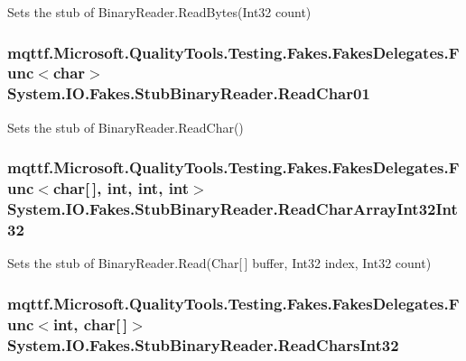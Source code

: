 Sets the stub of Binary\-Reader.\-Read\-Bytes(\-Int32 count)

\hypertarget{class_system_1_1_i_o_1_1_fakes_1_1_stub_binary_reader_a1932ca0fee22013df724e74ee7203d75}{
\subsubsection[{Read\-Char01}]{\setlength{\rightskip}{0pt plus 5cm}mqttf.\-Microsoft.\-Quality\-Tools.\-Testing.\-Fakes.\-Fakes\-Delegates.\-Func$<$char$>$ System.\-I\-O.\-Fakes.\-Stub\-Binary\-Reader.\-Read\-Char01}}\label{class_system_1_1_i_o_1_1_fakes_1_1_stub_binary_reader_a1932ca0fee22013df724e74ee7203d75}


Sets the stub of Binary\-Reader.\-Read\-Char()

\hypertarget{class_system_1_1_i_o_1_1_fakes_1_1_stub_binary_reader_a8f63f2824a6d562de233a67c249feaeb}{
\subsubsection[{Read\-Char\-Array\-Int32\-Int32}]{\setlength{\rightskip}{0pt plus 5cm}mqttf.\-Microsoft.\-Quality\-Tools.\-Testing.\-Fakes.\-Fakes\-Delegates.\-Func$<$char\mbox{[}$\,$\mbox{]}, int, int, int$>$ System.\-I\-O.\-Fakes.\-Stub\-Binary\-Reader.\-Read\-Char\-Array\-Int32\-Int32}}\label{class_system_1_1_i_o_1_1_fakes_1_1_stub_binary_reader_a8f63f2824a6d562de233a67c249feaeb}


Sets the stub of Binary\-Reader.\-Read(\-Char\mbox{[}$\,$\mbox{]} buffer, Int32 index, Int32 count)

\hypertarget{class_system_1_1_i_o_1_1_fakes_1_1_stub_binary_reader_ab7c3d2dd7a8f0acbcd63340c147f32e0}{
\subsubsection[{Read\-Chars\-Int32}]{\setlength{\rightskip}{0pt plus 5cm}mqttf.\-Microsoft.\-Quality\-Tools.\-Testing.\-Fakes.\-Fakes\-Delegates.\-Func$<$int, char\mbox{[}$\,$\mbox{]}$>$ System.\-I\-O.\-Fakes.\-Stub\-Binary\-Reader.\-Read\-Chars\-Int32}}\label{class_system_1_1_i_o_1_1_fakes_1_1_stub_binary_reader_ab7c3d2dd7a8f0acbcd63340c147f32e0}


